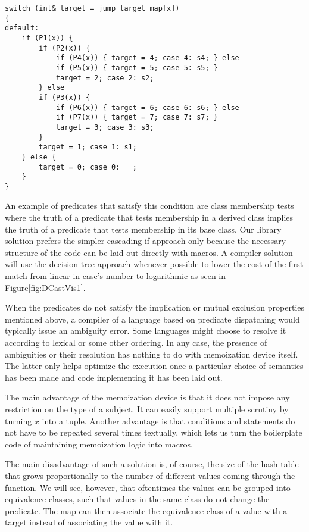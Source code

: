 \begin{lstlisting}
switch (int& target = jump_target_map[x])
{
default:
    if (P1(x)) {
        if (P2(x)) {
            if (P4(x)) { target = 4; case 4: s4; } else
            if (P5(x)) { target = 5; case 5: s5; } 
            target = 2; case 2: s2;
        } else
        if (P3(x)) {
            if (P6(x)) { target = 6; case 6: s6; } else
            if (P7(x)) { target = 7; case 7: s7; } 
            target = 3; case 3: s3;
        }
        target = 1; case 1: s1;
    } else {
        target = 0; case 0:   ;
    }
}
\end{lstlisting}

\noindent
An example of predicates that satisfy this condition are class membership tests
where the truth of a predicate that tests membership in a derived class implies 
the truth of a predicate that tests membership in its base class. Our library 
solution prefers the simpler cascading-if approach only because the necessary 
structure of the code can be laid out directly with macros. A compiler solution 
will use the decision-tree approach whenever possible to lower the cost of the 
first match from linear in case's number to logarithmic as seen in Figure\ref{fig:DCastVis1}.

When the predicates do not satisfy the implication or mutual exclusion properties 
mentioned above, a compiler of a language based on predicate dispatching would 
typically issue an ambiguity error. Some languages might choose to resolve it 
according to lexical or some other ordering. In any case, the presence of 
ambiguities or their resolution has nothing to do with memoization device 
itself. The latter only helps optimize the execution once a particular choice of 
semantics has been made and code implementing it has been laid out.

The main advantage of the memoization device is that it does not impose any 
restriction on the type of a subject. It can easily support multiple scrutiny 
by turning $x$ into a tuple. Another advantage is that conditions and statements 
do not have to be repeated several times textually, which lets us turn the 
boilerplate code of maintaining memoization logic into macros.

The main disadvantage of such a solution is, of course, the size of the hash table 
that grows proportionally to the number of different values coming through the 
function. We will see, however, that oftentimes the values can be grouped into 
equivalence classes, such that values in the same class do not change the 
predicate. The map can then associate the equivalence class of a value with a
target instead of associating the value with it.

